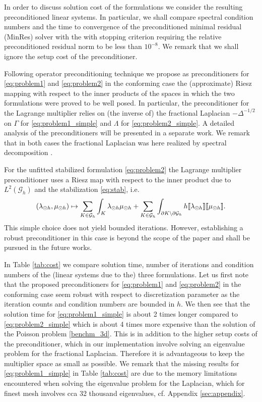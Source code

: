 \documentclass[r]{siamart171218}
\begin{document}
In order to discuss solution cost of the formulations we consider 
the resulting preconditioned linear systems. In particular, we shall compare
spectral condition numbers and the time to convergence of the preconditioned
minimal residual (MinRes) solver with the with stopping criterion requiring
the relative preconditioned residual norm to be less than $10^{-8}$. We remark
that we shall ignore the setup cost of the preconditioner.

Following operator preconditioning technique \cite{mardal2011preconditioning} we
propose as preconditioners for \eqref{eq:problem1} and \eqref{eq:problem2} in the
conforming case the (approximate) Riesz mapping with respect to the inner products of
the spaces in which the two formulations were proved to be well posed.
In particular, the preconditioner for the Lagrange multiplier relies on
(the inverse of) the fractional Laplacian $-\Delta^{-1/2}$ on $\Gamma$ for
\eqref{eq:problem1_simple} and $\Lambda$ for \eqref{eq:problem2_simple}.
A detailed analysis of the preconditioners will be presented in a separate
work. We remark that in both cases the fractional Laplacian was here realized
by spectral decomposition \cite{kuchta2016preconditioners}.

For the unfitted stabilized formulation \eqref{eq:problem2} the Lagrange multiplier preconditioner
uses a Riesz map with respect to the inner product due to $L^2(\mathcal{G}_h)$ and
the stabilization \eqref{eq:stab}, i.e.
\[
(\lambda_{\odot h}, \mu_{\odot h}) \mapsto \sum _{K\in \mathcal{G}_h}\int_{K}\lambda_{\odot h} \mu_{\odot h} + \sum _{K\in \mathcal{G}_h} \int_{\partial K \setminus \partial \mathcal{G}_h} h \llbracket \lambda_{\odot h} \rrbracket \llbracket \mu_{\odot h} \rrbracket.
\]
This simple choice does not yield bounded
iterations. However, establishing a robust preconditioner in this case 
is beyond the scope of the paper and shall be pursued in the future works.


In Table \ref{tab:cost} we compare solution time, number of iterations and
condition numbers of the (linear systems due to the) three formulations.
Let us first note that the proposed preconditioners for \eqref{eq:problem1} and
\eqref{eq:problem2} in the conforming case seem robust with respect to discretization
parameter as the iteration counts and condition numbers are bounded in $h$.
We then see that the solution time for \eqref{eq:problem1_simple} is about 2 times
longer compared to \eqref{eq:problem2_simple} which is about 4 times more expensive
than the solution of the Poisson problem \eqref{benchm_3d}. This is in addition to the
higher setup costs of the preconditioner, which in our implementation involve solving
an eigenvalue problem for the fractional Laplacian. Therefore it is advantageous to keep
the multiplier space as small as possible. We remark that the missing
results for \eqref{eq:problem1_simple} in Table \ref{tab:cost} are due to the
memory limitations encountered when solving the eigenvalue problem
for the Laplacian, which for finest mesh involves cca 32 thousand eigenvalues, cf. Appendix \ref{sec:appendix}.
%
\end{document}
